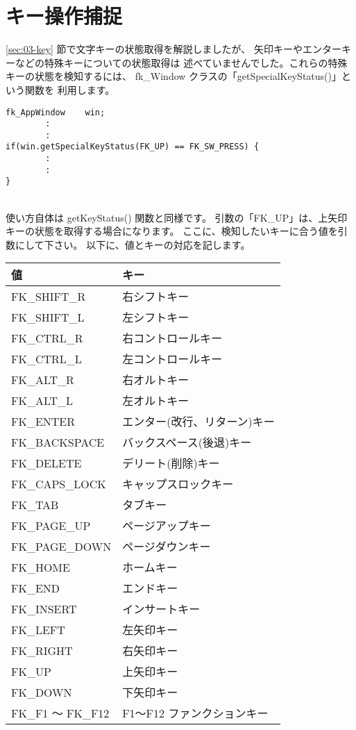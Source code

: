 \section{キー操作捕捉} \label{sec:05-specialkey}
\ref{sec:03-key} 節で文字キーの状態取得を解説しましたが、
矢印キーやエンターキーなどの特殊キーについての状態取得は
述べていませんでした。これらの特殊キーの状態を検知するには、
fk\_Window クラスの「getSpecialKeyStatus()」という関数を
利用します。\\
\begin{screen}
\begin{verbatim}
fk_AppWindow    win;
        :
        :
if(win.getSpecialKeyStatus(FK_UP) == FK_SW_PRESS) {
        :
        :
}
\end{verbatim}
\end{screen}
~ \\
使い方自体は getKeyStatus() 関数と同様です。
引数の「FK\_UP」は、上矢印キーの状態を取得する場合になります。
ここに、検知したいキーに合う値を引数にして下さい。
以下に、値とキーの対応を記します。
\begin{center}
\begin{tabular}{|l|l|}
\hline
値 & キー \\ \hline \hline
FK\_SHIFT\_R & 右シフトキー \\ \hline
FK\_SHIFT\_L & 左シフトキー \\ \hline
FK\_CTRL\_R & 右コントロールキー \\ \hline
FK\_CTRL\_L & 左コントロールキー \\ \hline
FK\_ALT\_R & 右オルトキー \\ \hline
FK\_ALT\_L & 左オルトキー \\ \hline
FK\_ENTER & エンター(改行、リターン)キー \\ \hline
FK\_BACKSPACE & バックスペース(後退)キー \\ \hline
FK\_DELETE & デリート(削除)キー \\ \hline
FK\_CAPS\_LOCK & キャップスロックキー \\ \hline
FK\_TAB & タブキー \\ \hline
FK\_PAGE\_UP & ページアップキー \\ \hline
FK\_PAGE\_DOWN & ページダウンキー \\ \hline
FK\_HOME & ホームキー \\ \hline
FK\_END & エンドキー \\ \hline
FK\_INSERT & インサートキー \\ \hline
FK\_LEFT & 左矢印キー \\ \hline
FK\_RIGHT & 右矢印キー \\ \hline
FK\_UP & 上矢印キー \\ \hline
FK\_DOWN & 下矢印キー \\ \hline
FK\_F1 〜 FK\_F12 & F1〜F12 ファンクションキー \\ \hline
\end{tabular}
\end{center}
